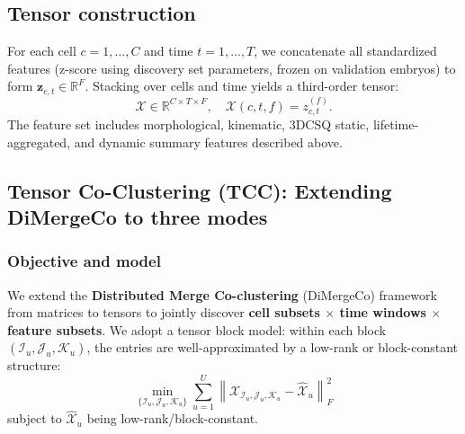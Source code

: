 \documentclass[unnumsec,webpdf,modern,large,namedate]{oup-authoring-template}%
\theoremstyle{thmstyleone}\newtheorem{theorem}{Theorem}
\theoremstyle{thmstyletwo}\newtheorem{example}{Example}
\theoremstyle{thmstylethree}\newtheorem{definition}{Definition}
\begin{document}
\subsection{Tensor construction}
For each cell $c = 1,\dots,C$ and time $t = 1,\dots,T$, we concatenate all standardized features (z-score using discovery set parameters, frozen on validation embryos) to form $\mathbf{z}_{c,t} \in \mathbb{R}^F$. Stacking over cells and time yields a third-order tensor:
\begin{equation}
\mathcal{X} \in \mathbb{R}^{C \times T \times F}, \quad \mathcal{X}(c,t,f) = z_{c,t}^{(f)}.
\label{eq:tensor-def}
\end{equation}
The feature set includes morphological, kinematic, 3DCSQ static, lifetime-aggregated, and dynamic summary features described above.
 
\subsection{Tensor Co-Clustering (TCC): Extending DiMergeCo to three modes}
 
\subsubsection{Objective and model}
We extend the \textbf{Distributed Merge Co-clustering} (DiMergeCo) framework from matrices to tensors to jointly discover \textbf{cell subsets $\times$ time windows $\times$ feature subsets}. We adopt a tensor block model: within each block $(\mathcal{I}_u,\mathcal{J}_u,\mathcal{K}_u)$, the entries are well-approximated by a low-rank or block-constant structure:
\begin{equation}
\min_{\{\mathcal{I}_u,\mathcal{J}_u,\mathcal{K}_u\}} \sum_{u=1}^{U} \left\| \mathcal{X}_{\mathcal{I}_u,\mathcal{J}_u,\mathcal{K}_u} - \hat{\mathcal{X}}_u \right\|_F^2
\label{eq:block-objective}
\end{equation}
subject to $\hat{\mathcal{X}}_u$ being low-rank/block-constant.
\end{document}

